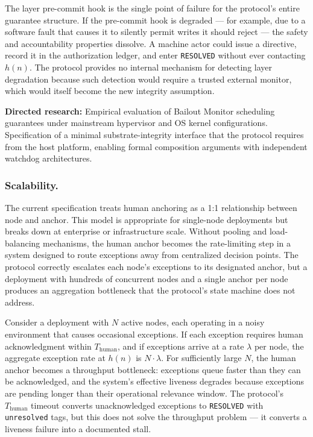 The \fact{} layer pre-commit hook is the single point of failure for the protocol's entire guarantee structure. If the pre-commit hook is degraded --- for example, due to a software fault that causes it to silently permit writes it should reject --- the safety and accountability properties dissolve. A machine actor could issue a directive, record it in the authorization ledger, and enter \texttt{RESOLVED} without ever contacting $h(n)$. The protocol provides no internal mechanism for detecting \fact{} layer degradation because such detection would require a trusted external monitor, which would itself become the new integrity assumption.

\medskip\noindent\textbf{Directed research:} Empirical evaluation of Bailout Monitor scheduling guarantees under mainstream hypervisor and OS kernel configurations. Specification of a minimal substrate-integrity interface that the protocol requires from the host platform, enabling formal composition arguments with independent watchdog architectures.

\subsubsection{Scalability.}
The current specification treats human anchoring as a 1:1 relationship between node and anchor. This model is appropriate for single-node deployments but breaks down at enterprise or infrastructure scale. Without pooling and load-balancing mechanisms, the human anchor becomes the rate-limiting step in a system designed to route exceptions away from centralized decision points. The protocol correctly escalates each node's exceptions to its designated anchor, but a deployment with hundreds of concurrent nodes and a single anchor per node produces an aggregation bottleneck that the protocol's state machine does not address.

Consider a deployment with $N$ active nodes, each operating in a noisy environment that causes occasional exceptions. If each exception requires human acknowledgment within $T_{\mathrm{human}}$, and if exceptions arrive at a rate $\lambda$ per node, the aggregate exception rate at $h(n)$ is $N \cdot \lambda$. For sufficiently large $N$, the human anchor becomes a throughput bottleneck: exceptions queue faster than they can be acknowledged, and the system's effective liveness degrades because exceptions are pending longer than their operational relevance window. The protocol's $T_{\mathrm{human}}$ timeout converts unacknowledged exceptions to \texttt{RESOLVED} with \texttt{unresolved} tags, but this does not solve the throughput problem --- it converts a liveness failure into a documented stall.

